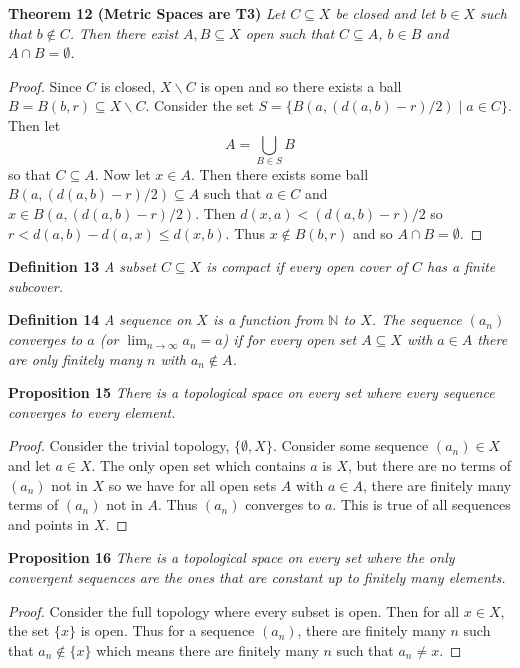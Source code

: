 \documentclass{article}
\begin{document}
\begin{flushleft}
\textbf{Theorem 12 (Metric Spaces are T3)}
\textsl{Let $C \subseteq X$ be closed and let $b \in X$ such that $b \notin C$. Then there exist $A, B \subseteq X$ open such that $C \subseteq A$, $b \in B$ and $A \cap B = \emptyset$.}
\begin{proof}
Since $C$ is closed, $X \backslash C$ is open and so there exists a ball $B = B(b, r) \subseteq X \backslash C$. Consider the set $S = \{B(a, (d(a,b)-r)/2) \mid a \in C\}$. Then let
\[
A = \bigcup_{B \in S} B
\]
so that $C \subseteq A$. Now let $x \in A$. Then there exists some ball $B(a, (d(a,b)-r)/2) \subseteq A$ such that $a \in C$ and $x \in B(a, (d(a,b)-r)/2)$. Then $d(x,a) < (d(a,b)-r)/2$ so $r < d(a,b) - d(a,x) \leq d(x,b)$. Thus $x \notin B(b,r)$ and so $A \cap B = \emptyset$.
\end{proof}

\textbf{Definition 13}
\textsl{A subset $C \subseteq X$ is compact if every open cover of $C$ has a finite subcover.}\newline

\textbf{Definition 14}
\textsl{A sequence on $X$ is a function from $\mathbb{N}$ to $X$. The sequence $(a_n)$ converges to $a$ (or $\lim_{n \rightarrow \infty} a_n = a$) if for every open set $A \subseteq X$ with $a \in A$ there are only finitely many $n$ with $a_n \notin A$.}\newline

\textbf{Proposition 15}
\textsl{There is a topological space on every set where every sequence converges to every element.}
\begin{proof}
Consider the trivial topology, $\{\emptyset, X\}$. Consider some sequence $(a_n) \in X$ and let $a \in X$. The only open set which contains $a$ is $X$, but there are no terms of $(a_n)$ not in $X$ so we have for all open sets $A$ with $a \in A$, there are finitely many terms of $(a_n)$ not in $A$. Thus $(a_n)$ converges to $a$. This is true of all sequences and points in $X$.
\end{proof}

\textbf{Proposition 16}
\textsl{There is a topological space on every set where the only convergent sequences are the ones that are constant up to finitely many elements.}
\begin{proof}
Consider the full topology where every subset is open. Then for all $x \in X$, the set $\{x\}$ is open. Thus for a sequence $(a_n)$, there are finitely many $n$ such that $a_n \notin \{x\}$ which means there are finitely many $n$ such that $a_n \neq x$.
\end{proof}


\end{flushleft}
\end{document}
